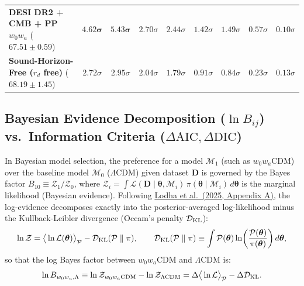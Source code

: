 \documentclass[aps,prd,preprint,superscriptaddress,nofootinbib]{revtex4-2}
\begin{document}
\begin{table}[!htbp]
{\begin{tabular}{lcccccccc}
\textbf{DESI DR2 + CMB + PP $w_0 w_a$} ($67.51 \pm 0.59$) & $\mathbf{4.62}\boldsymbol{\sigma}$ & $\mathbf{5.43}\boldsymbol{\sigma}$ & $2.70\sigma$ & $2.44\sigma$ & $1.42\sigma$ & $1.49\sigma$ & $0.57\sigma$ & $0.10\sigma$ \\
\textbf{Sound-Horizon-Free ($r_d$ free)} ($68.19 \pm 1.45$) & $2.72\sigma$ & $2.95\sigma$ & $2.04\sigma$ & $1.79\sigma$ & $0.91\sigma$ & $0.84\sigma$ & $0.23\sigma$ & $0.13\sigma$ \\
\bottomrule
\end{tabular}%
}
\end{table}

\subsection{Bayesian Evidence Decomposition ($\ln B_{ij}$) vs.\ Information Criteria ($\Delta\text{AIC}, \allowbreak \Delta\text{DIC}$)}

In Bayesian model selection, the preference for a model $\mathcal{M}_1$ (such as $w_0 w_a$CDM) over the baseline model $\mathcal{M}_0$ ($\Lambda$CDM) given dataset $\mathbf{D}$ is governed by the Bayes factor $B_{10} \equiv \mathcal{Z}_1 / \mathcal{Z}_0$, where $\mathcal{Z}_i = \int \mathcal{L}(\mathbf{D}\mid\boldsymbol{\theta}, \mathcal{M}_i)\, \pi(\boldsymbol{\theta}\mid\mathcal{M}_i)\, d\boldsymbol{\theta}$ is the marginal likelihood (Bayesian evidence). Following \href{https://arxiv.org/abs/2503.14743}{Lodha et al.\ (2025, Appendix A)}, the log-evidence decomposes exactly into the posterior-averaged log-likelihood minus the Kullback-Leibler divergence (Occam's penalty $\mathcal{D}_{\rm KL}$):
\begin{equation}
    \ln \mathcal{Z} = \big\langle \ln \mathcal{L}(\boldsymbol{\theta}) \big\rangle_{\mathcal{P}} - \mathcal{D}_{\rm KL}(\mathcal{P} \parallel \pi), \qquad \mathcal{D}_{\rm KL}(\mathcal{P} \parallel \pi) \equiv \int \mathcal{P}(\boldsymbol{\theta}) \ln\!\left( \frac{\mathcal{P}(\boldsymbol{\theta})}{\pi(\boldsymbol{\theta})} \right) d\boldsymbol{\theta},
    \label{m:eq:evidence_kl}
\end{equation}
so that the log Bayes factor between $w_0 w_a$CDM and $\Lambda$CDM is:
\begin{equation}
    \ln B_{w_0 w_a, \Lambda} \equiv \ln \mathcal{Z}_{w_0 w_a\text{CDM}} - \ln \mathcal{Z}_{\Lambda\text{CDM}} = \Delta \big\langle \ln \mathcal{L} \big\rangle_{\mathcal{P}} - \Delta \mathcal{D}_{\rm KL}.
    \label{m:eq:bayes_factor_decomp}
\end{equation}
\end{document}
